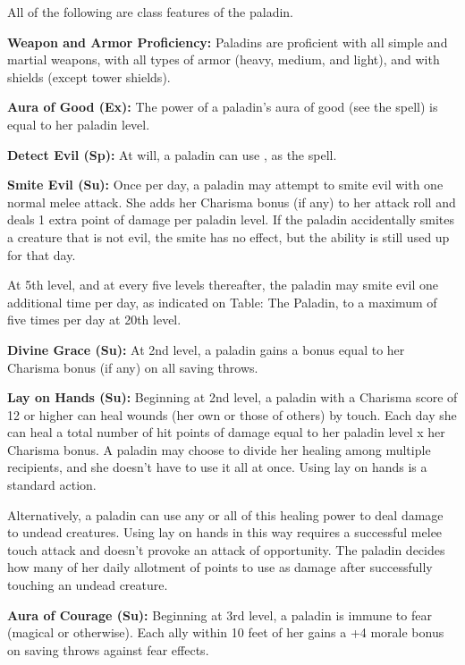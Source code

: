 \ClassFeatures

All of the following are class features of the paladin.

\textbf{Weapon and Armor Proficiency:} Paladins are proficient with all simple 
and martial weapons, with all types of armor (heavy, medium, and light), and with 
shields (except tower shields).

\textbf{Aura of Good (Ex):} The power of a paladin's aura of good (see the  spell) is equal to her paladin level.

\textbf{Detect Evil (Sp):} At will, a paladin can use , as the spell.

\textbf{Smite Evil (Su):} Once per day, a paladin may attempt to smite evil with 
one normal melee attack. She adds her Charisma bonus (if any) to her attack roll 
and deals 1 extra point of damage per paladin level. If the paladin accidentally 
smites a creature that is not evil, the smite has no effect, but the ability is 
still used up for that day.

At 5th level, and at every five levels thereafter, the paladin may smite evil one 
additional time per day, as indicated on Table: The Paladin, to a maximum of five 
times per day at 20th level.

\textbf{Divine Grace (Su):} At 2nd level, a paladin gains a bonus equal to her 
Charisma bonus (if any) on all saving throws.

\textbf{Lay on Hands (Su):} Beginning at 2nd level, a paladin with a Charisma score 
of 12 or higher can heal wounds (her own or those of others) by touch. Each day 
she can heal a total number of hit points of damage equal to her paladin level 
x her Charisma bonus. A paladin may choose to divide her healing among multiple 
recipients, and she doesn't have to use it all at once. Using lay on hands is a 
standard action.

Alternatively, a paladin can use any or all of this healing power to deal damage 
to undead creatures. Using lay on hands in this way requires a successful melee 
touch attack and doesn't provoke an attack of opportunity. The paladin decides 
how many of her daily allotment of points to use as damage after successfully touching 
an undead creature.

\textbf{Aura of Courage (Su):} Beginning at 3rd level, a paladin is immune to fear 
(magical or otherwise). Each ally within 10 feet of her gains a +4 morale bonus 
on saving throws against fear effects.

